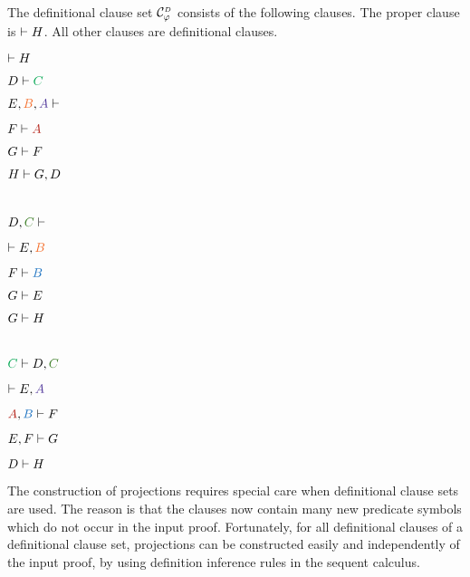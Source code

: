 \begin{example}
\noindent
The definitional clause set $\clausesetDefinitional{\varphi}$ consists of the following clauses. The proper clause is $\vdash H$. All other clauses are definitional clauses.

\begin{multicols}{3}{
{
$\vdash H$

$D \seq \hE{C}$

$E, \hC{B}, \hD{A} \seq $

$F \seq \hA{A}$

$G \vdash F$

$H \vdash G, D$
}

{
$\phantom{\seq H}$

$D, \hF{C} \seq $

$\seq E, \hC{B}$

$F \seq \hB{B}$

$G \vdash E$

$G \vdash H$
}

{
$\phantom{\seq H}$

$ \hE{C} \seq D, \hF{C}$

$\seq E, \hD{A}$

$\hA{A}, \hB{B} \seq F$

$E, F \vdash G$

$D \vdash H$
}
}\end{multicols}
\hfill\QED
\end{example}

\noindent
The construction of projections requires special care when definitional clause sets are used. The reason is that the clauses now contain many new predicate symbols which do not occur in the input proof. Fortunately, for all definitional clauses of a definitional clause set, projections can be constructed easily and independently of the input proof, by using definition inference rules in the sequent calculus.

